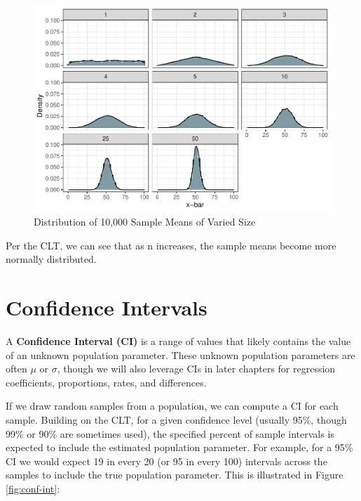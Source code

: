 \documentclass[]{book}
\begin{document}
\begin{figure}

{\centering \includegraphics{People_Analytics_Lifecycle_files/figure-latex/unnamed-chunk-92-1} 

}

\caption{Distribution of 10,000 Sample Means of Varied Size}\label{fig:unnamed-chunk-92}
\end{figure}

Per the CLT, we can see that as n increases, the sample means become more normally distributed.

\hypertarget{confidence-intervals}{%
\section{Confidence Intervals}\label{confidence-intervals}}

A \textbf{Confidence Interval (CI)} is a range of values that likely contains the value of an unknown population parameter. These unknown population parameters are often \(\mu\) or \(\sigma\), though we will also leverage CIs in later chapters for regression coefficients, proportions, rates, and differences.

If we draw random samples from a population, we can compute a CI for each sample. Building on the CLT, for a given confidence level (usually 95\%, though 99\% or 90\% are sometimes used), the specified percent of sample intervals is expected to include the estimated population parameter. For example, for a 95\% CI we would expect 19 in every 20 (or 95 in every 100) intervals across the samples to include the true population parameter. This is illustrated in Figure \ref{fig:conf-int}:
\end{document}
